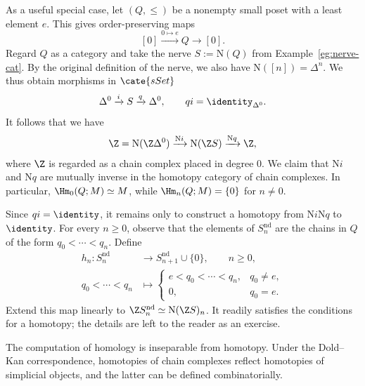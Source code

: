 \begin{example}\label{eg:homology-poset-e}
	As a useful special case, let $(Q,\leq)$ be a nonempty small poset with a
	least element $e$. This gives order-preserving maps
	\[
	[0]\xrightarrow{0\mapsto e}Q\longrightarrow[0].
	\]
	Regard $Q$ as a category and take the nerve $S:=\mathrm{N}(Q)$ from
	Example~\ref{eg:nerve-cat}. By the original definition of the nerve, we
	also have $\mathrm{N}([n])=\Delta^n$. We thus obtain morphisms in
	$\cate{sSet}$
	\[
	\Delta^0\xrightarrow{i}S\xrightarrow{q}\Delta^0,
	\qquad qi=\identity_{\Delta^0}.
	\]
	It follows that we have
	\begin{gather*}
		\Z=\mathrm{N}(\Z\Delta^0)
		\xrightarrow{\mathrm{N}i}\mathrm{N}(\Z S)
		\xrightarrow{\mathrm{N}q}\Z,
	\end{gather*}
	where $\Z$ is regarded as a chain complex placed in degree $0$. We claim
	that $\mathrm{N}i$ and $\mathrm{N}q$ are mutually inverse in the homotopy
	category of chain complexes. In particular,
	$\Hm_0(Q;M)\simeq M$, while $\Hm_n(Q;M)=\{0\}$ for $n\neq0$.

	Since $qi=\identity$, it remains only to construct a homotopy from
	$\mathrm{N}i\mathrm{N}q$ to $\identity$. For every $n\geq0$, observe that
	the elements of $S_n^{\mathrm{nd}}$ are the chains in $Q$ of the form
	$q_0<\cdots<q_n$. Define
	\begin{align*}
		h_n:S_n^{\mathrm{nd}}&\longrightarrow
		S_{n+1}^{\mathrm{nd}}\cup\{0\},\qquad n\geq0,\\
		q_0<\cdots<q_n&\longmapsto
		\begin{cases}
			e<q_0<\cdots<q_n,&q_0\neq e,\\
			0,&q_0=e.
		\end{cases}
	\end{align*}
	Extend this map linearly to
	$\Z S_n^{\mathrm{nd}}\simeq\mathrm{N}(\Z S)_n$. It readily satisfies
	the conditions for a homotopy; the details are left to the reader as an
	exercise.
\end{example}

The computation of homology is inseparable from homotopy. Under the
Dold--Kan correspondence, homotopies of chain complexes reflect homotopies of
simplicial objects, and the latter can be defined combinatorially.

